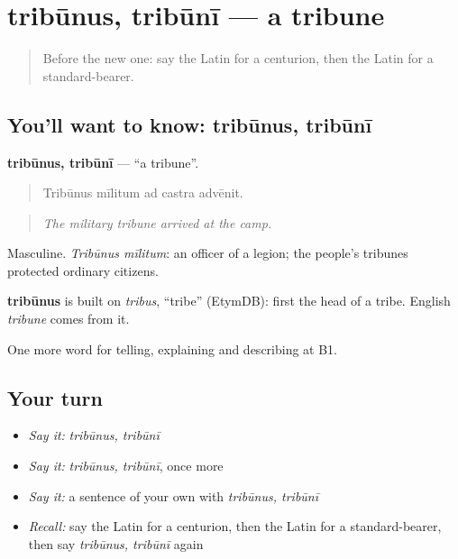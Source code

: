 \section[tribūnus, tribūnī]{tribūnus, tribūnī — a tribune}

\label{lesson:LA-C338-tribunus}



\begin{quote}
Before the new one: say the Latin for a centurion, then the Latin for a standard-bearer.
\end{quote}

\subsection*{You'll want to know: tribūnus, tribūnī}
\textbf{tribūnus, tribūnī} — \textquotedblleft{}a tribune\textquotedblright{}.

\begin{quote}
Tribūnus mīlitum ad castra advēnit.
\end{quote}

\begin{quote}
\emph{The military tribune arrived at the camp.}
\end{quote}

Masculine. \emph{Tribūnus mīlitum}: an officer of a legion; the people's tribunes protected ordinary citizens.

\begin{cousinweb}
\textbf{tribūnus} is built on \emph{tribus}, \textquotedblleft{}tribe\textquotedblright{} (EtymDB): first the head of a tribe. English \emph{tribune} comes from it.
\end{cousinweb}

\begin{grammarlens}[title={What you've built}]
One more word for telling, explaining and describing at B1.
\end{grammarlens}

\subsection*{Your turn}
\begin{itemize}
\raggedright
  \item \emph{Say it:} \emph{tribūnus, tribūnī}
  \item \emph{Say it:} \emph{tribūnus, tribūnī}, once more
  \item \emph{Say it:} a sentence of your own with \emph{tribūnus, tribūnī}
  \item \emph{Recall:} say the Latin for a centurion, then the Latin for a standard-bearer, then say \emph{tribūnus, tribūnī} again
\end{itemize}

